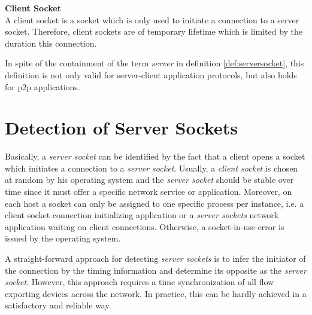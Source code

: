 \parbox{ 
\textwidth}{ 
\begin{defn}
	{\textbf{Client Socket}\\} A client socket is a socket which is only used to initiate a connection to a server socket. Therefore, client sockets are of temporary lifetime which is limited by the duration this connection. 
\end{defn}
}

In spite of the containment of the term \emph{server} in definition \ref{def:serversocket}, this definition is not only valid for server-client application protocols, but also holds for \gls{p2p} applications. 


\section{Detection of Server Sockets 
\label{section:socket_detection}}

Basically, a \emph{server socket} can be identified by the fact that a client opens a socket which initiates a connection to a \emph{server socket}. Usually, a \emph{client socket} is chosen at random by his operating system and the \emph{server socket} should be stable over time since it must offer a specific network service or application. Moreover, on each host a socket can only be assigned to one specific process per instance, i.e. a client socket connection initializing application or a \emph{server sockets} network application waiting on client connections. Otherwise, a socket-in-use-error is issued by the operating system. 

A straight-forward approach for detecting \emph{server sockets} is to infer the initiator of the connection by the timing information and determine its opposite as the \emph{server socket}. However, this approach requires a time synchronization of all flow exporting devices across the network. In practice, this can be hardly achieved in a satisfactory and reliable way.

